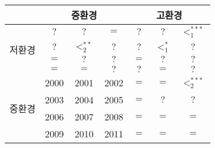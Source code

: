\begin{tabular}{c|c|c|c|c|c|c}
\hline & \multicolumn{3}{|c|}{중환경} & \multicolumn{3}{c}{고환경} \\
\hline \multirow{4}{*}{저환경} & $?$ & $?$ & $=$ & $?$ & $?$ & $<_{1}^{***}$ \\
\cline{2-7} & $?$ & $<_{2}^{**}$ & $?$ & $?$ & $<_{1}^{*}$ & $?$ \\
\cline{2-7} & $=$ & $?$ & $?$ & $=$ & $?$ & $?$ \\
\cline{2-7} & $=$ & $=$ & $?$ & $?$ & $=$ & $?$ \\
\hline \multirow{4}{*}{중환경} & 2000 & 2001 & 2002 & $=$ & $=$ & $<_{2}^{***}$ \\
\cline{2-7} & 2003 & 2004 & 2005 & $=$ & $?$ & $?$ \\
\cline{2-7} & 2006 & 2007 & 2008 & $=$ & $=$ & $=$ \\
\cline{2-7} & 2009 & 2010 & 2011 & $=$ & $=$ & $=$\\
\hline
\end{tabular}